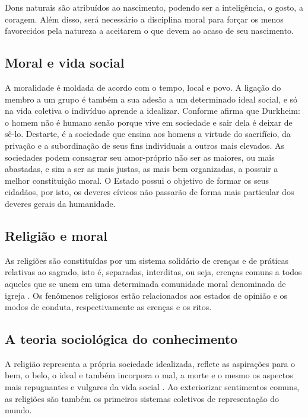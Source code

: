 Dons naturais são atribuídos ao nascimento, podendo ser a inteligência, o gosto, a coragem.
Além disso, será necessário a disciplina moral para forçar os menos favorecidos pela natureza a aceitarem o que devem ao acaso de seu nascimento.


\subsection{Moral e vida social}

A moralidade é moldada de acordo com o tempo, local e povo.
A ligação do membro a um grupo é também a sua adesão a um determinado ideal social, e só na vida coletiva o indivíduo aprende a idealizar. 
Conforme \cite{quintaneiro2003toque} afirma que Durkheim: o homem não é humano senão porque vive em sociedade e sair dela é deixar de sê-lo. 
Destarte, é a sociedade que ensina aos homens a virtude do sacrifício, da privação e a subordinação de seus fins individuais a outros mais elevados.
As sociedades podem consagrar seu amor-próprio não ser as maiores, ou mais abastadas, e sim a ser as mais justas, as mais bem organizadas, a possuir a melhor constituição moral.
O Estado possui o objetivo de formar os seus cidadãos, por isto, os deveres cívicos não passarão de forma mais particular dos deveres gerais da humanidade.


\subsection{Religião e moral}

As religiões são constituídas por um sistema solidário de crenças e de práticas relativas ao sagrado, isto é, separadas, interditas, ou seja, crenças comuns a todos aqueles que se unem em uma determinada comunidade moral denominada de igreja \cite{quintaneiro2003toque}.
Os fenômenos religiosos estão relacionados aos estados de opinião e os modos de conduta, respectivamente as crenças e os ritos.


\subsection{A teoria sociológica do conhecimento}

A religião representa a própria sociedade idealizada, reflete as aspirações para o bem, o belo, o ideal e também incorpora o mal, a morte e o mesmo os aspectos mais repugnantes e vulgares da vida social \cite{quintaneiro2003toque}.
Ao exteriorizar sentimentos comuns, as religiões são também os primeiros sistemas coletivos de representação do mundo.


